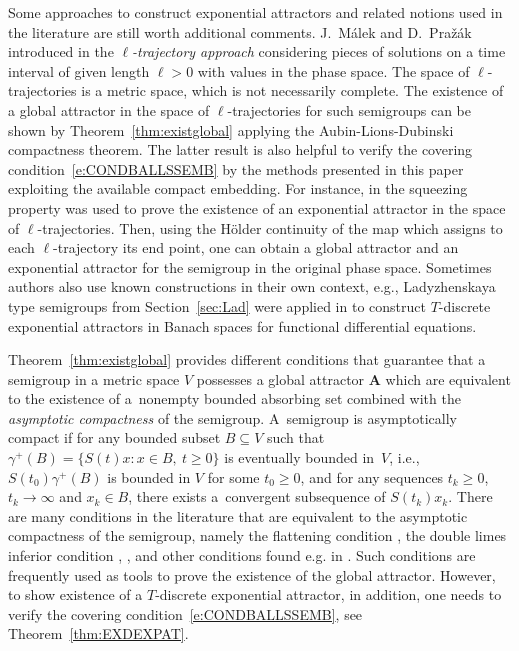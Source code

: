\documentclass[a4paper,12pt,reqno]{amsart}
\theoremstyle{plain}
\theoremstyle{definition}
\numberwithin{equation}{section}
\renewcommand{\geq}{\geqslant}
\begin{document}
Some approaches to construct exponential attractors and related notions used in the literature are still worth additional comments.  
J.~M\'alek and D.~Pra\v{z}\'ak introduced in \cite{MP02} the \emph{$\ell$-trajectory approach} considering  pieces of solutions on a time interval of given length $\ell>0$ with values in the phase space. The space of $\ell$-trajectories is a metric space, which is not necessarily complete.
The existence of a global attractor in the space of $\ell$-trajectories for such semigroups can be shown by Theorem~\ref{thm:existglobal} applying the Aubin-Lions-Dubinski compactness theorem. The latter result is also helpful to verify the covering condition~\eqref{e:CONDBALLSSEMB} by the methods presented in this paper exploiting the available compact embedding. For instance,  in \cite{MP02} the squeezing property was used to prove the existence of an exponential attractor in the space of $\ell$-trajectories. Then, using the H\"older continuity of the map which assigns to each $\ell$-trajectory its end point, one can obtain a global attractor and an exponential attractor for the semigroup in the original phase space.      
Sometimes authors also use known constructions in their own context, e.g., Ladyzhenskaya type semigroups from Section~\ref{sec:Lad} were applied in \cite{CH25} to construct $T$-discrete exponential attractors in Banach spaces for functional differential equations.

Theorem~\ref{thm:existglobal} provides different conditions that guarantee that a semigroup in a metric space $V$ possesses a global attractor $\mathbf{A}$ which are equivalent to the existence of a~nonempty bounded absorbing set combined with the \emph{asymptotic compactness} of the semigroup. A~semigroup is asymptotically compact if for any bounded subset $B\subseteq V$ such that $\gamma^{+}(B)=\{S(t)x\colon x\in B,\ t\geq 0\}$ is eventually bounded in~$V$, i.e.,
$S(t_0)\gamma^{+}(B)$ is bounded in $V$ for some $t_0\geq 0$, and for any sequences $t_k\geq 0$, $t_{k}\to\infty$ and $x_k\in B$, there exists a~convergent subsequence of $S(t_k)x_k$.  
There are many conditions in the literature that are equivalent to  the asymptotic compactness of the semigroup,
namely the flattening condition \cite{MWZ02,KL07,CLR13}, the double limes inferior condition \cite{Khanmamedov06}, \cite[Proposition 2.2.18]{chueshov}, and other conditions found e.g. in \cite{chueshov, Lad91}. Such conditions are frequently used as tools to prove the existence of the global attractor. However, to show existence of a $T$-discrete exponential attractor, in addition, one needs to verify the covering condition~\eqref{e:CONDBALLSSEMB}, see Theorem~\ref{thm:EXDEXPAT}.  
\end{document}
